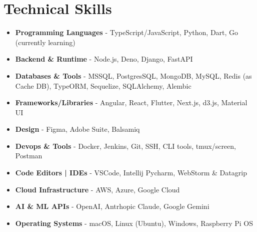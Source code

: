 \section{Technical Skills}
{
	\normalsize
	\begin{itemize}[topsep=0pt, partopsep=0pt, itemsep=0pt, parsep=0pt]
		\item \textbf{Programming Languages} - TypeScript/JavaScript, Python, Dart, Go (currently learning)
		\item \textbf{Backend \& Runtime} - Node.js, Deno, Django, FastAPI
		\item \textbf{Databases \& Tools} - MSSQL, PostgresSQL, MongoDB, MySQL, Redis (as Cache DB), TypeORM, Sequelize, SQLAlchemy, Alembic
		\item \textbf{Frameworks/Libraries} - Angular, React, Flutter, Next.js, d3.js, Material UI
		\item \textbf{Design} - Figma, Adobe Suite, Balsamiq
		\item \textbf{Devops \& Tools} - Docker, Jenkins, Git, SSH, CLI tools, tmux/screen, Postman
		\item \textbf{Code Editors | IDEs} - VSCode, Intellij Pycharm, WebStorm \& Datagrip
		\item \textbf{Cloud Infrastructure} - AWS, Azure, Google Cloud
		\item \textbf{AI \& ML APIs} - OpenAI, Antrhopic Claude, Google Gemini
		\item \textbf{Operating Systems} - macOS, Linux (Ubuntu), Windows, Raspberry Pi OS
	\end{itemize}
}